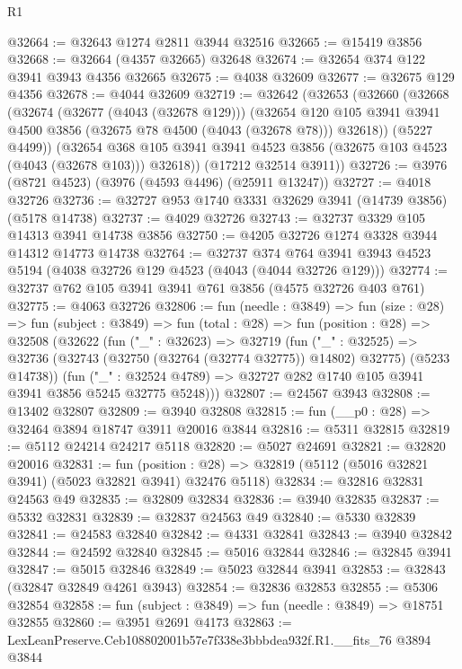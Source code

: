 \begin{lexlean}{R1}
\begin{coremodule}
@32664 := @32643 @1274 @2811 @3944 @32516
@32665 := @15419 @3856
@32668 := @32664 (@4357 @32665) @32648
@32674 := @32654 @374 @122 @3941 @3943 @4356 @32665
@32675 := @4038 @32609
@32677 := @32675 @129 @4356
@32678 := @4044 @32609
@32719 := @32642
    (@32653
      (@32660
        (@32668
          (@32674
            (@32677 (@4043 (@32678 @129)))
            (@32654
              @120
              @105
              @3941
              @3941
              @4500
              @3856
              (@32675 @78 @4500 (@4043 (@32678 @78)))
              @32618))
          (@5227 @4499))
        (@32654 @368 @105 @3941 @3941 @4523 @3856 (@32675 @103 @4523 (@4043 (@32678 @103))) @32618))
      (@17212 @32514 @3911))
@32726 := @3976 (@8721 @4523) (@3976 (@4593 @4496) (@25911 @13247))
@32727 := @4018 @32726
@32736 := @32727 @953 @1740 @3331 @32629 @3941 (@14739 @3856) (@5178 @14738)
@32737 := @4029 @32726
@32743 := @32737 @3329 @105 @14313 @3941 @14738 @3856
@32750 := @4205 @32726 @1274 @3328 @3944 @14312 @14773 @14738
@32764 := @32737
    @374
    @764
    @3941
    @3943
    @4523
    @5194
    (@4038 @32726 @129 @4523 (@4043 (@4044 @32726 @129)))
@32774 := @32737 @762 @105 @3941 @3941 @761 @3856 (@4575 @32726 @403 @761)
@32775 := @4063 @32726
@32806 := fun (needle : @3849) =>
  fun (size : @28) =>
  fun (subject : @3849) =>
  fun (total : @28) =>
  fun (position : @28) =>
  @32508
    (@32622
      (fun ("_" : @32623) =>
      @32719
        (fun ("_" : @32525) =>
        @32736 (@32743 (@32750 (@32764 (@32774 @32775)) @14802) @32775) (@5233 @14738))
        (fun ("_" : @32524 @4789) => @32727 @282 @1740 @105 @3941 @3941 @3856 @5245 @32775 @5248)))
@32807 := @24567 @3943
@32808 := @13402 @32807
@32809 := @3940 @32808
@32815 := fun (__p0 : @28) => @32464 @3894 @18747 @3911 @20016 @3844
@32816 := @5311 @32815
@32819 := @5112 @24214 @24217 @5118
@32820 := @5027 @24691
@32821 := @32820 @20016
@32831 := fun (position : @28) =>
  @32819 (@5112 (@5016 @32821 @3941) (@5023 @32821 @3941) @32476 @5118)
@32834 := @32816 @32831 @24563 @49
@32835 := @32809 @32834
@32836 := @3940 @32835
@32837 := @5332 @32831
@32839 := @32837 @24563 @49
@32840 := @5330 @32839
@32841 := @24583 @32840
@32842 := @4331 @32841
@32843 := @3940 @32842
@32844 := @24592 @32840
@32845 := @5016 @32844
@32846 := @32845 @3941
@32847 := @5015 @32846
@32849 := @5023 @32844 @3941
@32853 := @32843 (@32847 @32849 @4261 @3943)
@32854 := @32836 @32853
@32855 := @5306 @32854
@32858 := fun (subject : @3849) => fun (needle : @3849) => @18751 @32855
@32860 := @3951 @2691 @4173
@32863 := LexLeanPreserve.Ceb108802001b57e7f338e3bbbdea932f.R1.__fits_76 @3894 @3844

\end{coremodule}
\end{lexlean}
